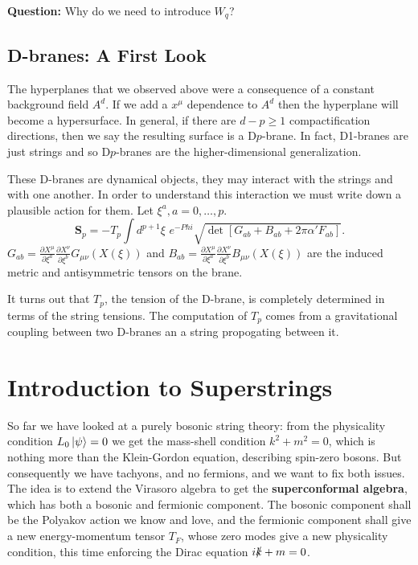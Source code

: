 \documentclass{report}
\theoremstyle{plain}
\theoremstyle{definition}
\theoremstyle{remark}
\newcommand{\PP}[2]{\frac{\di {#1}}{\di {#2}}}
\newcommand{\di}{\partial}
\begin{document}
\textbf{Question:} Why do we need to introduce $W_q$?

\section{D-branes: A First Look}
The hyperplanes that we observed above were a consequence of a constant
background field $A^d$. If we add a $x^\mu$ dependence to $A^d$ then the
hyperplane will become a hypersurface.  In general, if there are $d-p\ge1$
compactification directions, then we say the resulting surface is a
D$p$-brane. In fact, D1-branes are just strings and so D$p$-branes are the
higher-dimensional generalization. 

These D-branes are dynamical objects, they may interact with the strings 
and with one another. In order to understand this interaction we must write
down a plausible action for them. Let $\xi^a,a=0,\dots,p$.
\[ \bm S_p = -T_p\int d^{p+1}\xi\,\, e^{-Phi}
\sqrt{\det\left[ G_{ab}+B_{ab}+2\pi\alpha' F_{ab} \right]}.\]
$G_{ab} = \PP{X^\mu}{\xi^a}\PP{X^\nu}{\xi^b} G_{\mu\nu}(X(\xi))$ and
$B_{ab} = \PP{X^\mu}{\xi^a}\PP{X^\nu}{\xi^b} B_{\mu\nu}(X(\xi))$ are the
induced metric and antisymmetric tensors on the brane.

It turns out that $T_p$, the tension of the D-brane, is completely
determined in terms of the string tensions. The computation of $T_p$ comes
from a gravitational coupling between two D-branes an a string propogating
between it.

\chapter{Introduction to Superstrings}

So far we have looked at a purely bosonic string theory: from the
physicality condition $L_0\ket{\psi} = 0$ we get the mass-shell
condition $k^2 + m^2 = 0$, which is nothing more than the Klein-Gordon
equation, describing spin-zero bosons. But consequently we have
tachyons, and no fermions, and we want to fix both issues. The idea is
to extend the Virasoro algebra to get the {\bf superconformal
  algebra}, which has both a bosonic and fermionic component. The
bosonic component shall be the Polyakov action we know and love, and
the fermionic component shall give a new energy-momentum tensor $T_F$,
whose zero modes give a new physicality condition, this time enforcing
the Dirac equation $i\slashed{k} + m = 0$.
\end{document}
